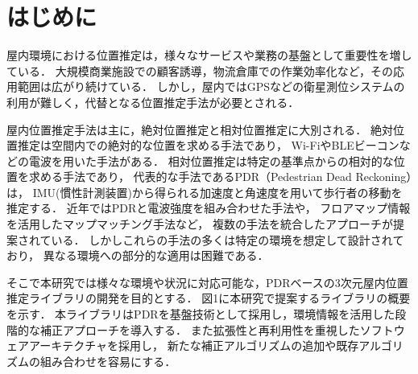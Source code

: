\documentclass[a4paper, 10pt, twocolumn]{jarticle}
\begin{document}


\section{はじめに}


屋内環境における位置推定は，様々なサービスや業務の基盤として重要性を増している．
大規模商業施設での顧客誘導，物流倉庫での作業効率化など，その応用範囲は広がり続けている．
しかし，屋内ではGPSなどの衛星測位システムの利用が難しく，代替となる位置推定手法が必要とされる．

屋内位置推定手法は主に，絶対位置推定と相対位置推定に大別される．
絶対位置推定は空間内での絶対的な位置を求める手法であり，
Wi-FiやBLEビーコンなどの電波を用いた手法がある．
相対位置推定は特定の基準点からの相対的な位置を求める手法であり，
代表的な手法であるPDR（Pedestrian Dead Reckoning）は，
IMU(慣性計測装置)から得られる加速度と角速度を用いて歩行者の移動を推定する．
近年ではPDRと電波強度を組み合わせた手法\cite{pdr-rss-fusion}や，
フロアマップ情報を活用したマップマッチング手法\cite{pdr-map}など，
複数の手法を統合したアプローチが提案されている．
しかしこれらの手法の多くは特定の環境を想定して設計されており，
異なる環境への部分的な適用は困難である．

そこで本研究では様々な環境や状況に対応可能な，PDRベースの3次元屋内位置推定ライブラリの開発を目的とする．
図1に本研究で提案するライブラリの概要を示す．
本ライブラリはPDRを基盤技術として採用し，環境情報を活用した段階的な補正アプローチを導入する．
また拡張性と再利用性を重視したソフトウェアアーキテクチャを採用し，
新たな補正アルゴリズムの追加や既存アルゴリズムの組み合わせを容易にする．
\end{document}
